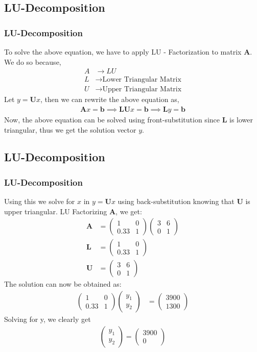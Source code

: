 \documentclass{beamer}
\theoremstyle{remark}
\newcommand{\myvec}[1]{\ensuremath{\begin{pmatrix}#1\end{pmatrix}}}
\let\vec\mathbf
\numberwithin{equation}{section}
\begin{document}
\subsection{LU-Decomposition}
\begin{frame}
	\frametitle{LU-Decomposition}
	To solve the above equation, we have to apply LU - Factorization to matrix $\vec{A}$. \\
	We do so because, 
	\begin{align}
		A &\rightarrow LU \\
		L &\rightarrow \text{Lower Triangular Matrix} \\
		U &\rightarrow \text{Upper Triangular Matrix}
	\end{align}
	Let $y = \vec{U}x$, then we can rewrite the above equation as,
	\begin{align}
		\vec{A}x = \vec{b} \implies \vec{LU}x = \vec{b} \implies \vec{L}y = \vec{b}
	\end{align}
	Now, the above equation can be solved using front-substitution since $\vec{L}$ is lower triangular, thus we get the solution vector $y$. \\
\end{frame}
\subsection{LU-Decomposition}
\begin{frame}
	\frametitle{LU-Decomposition}
	Using this we solve for $x$ in $y = \vec{U}x$ using back-substitution knowing that $\vec{U}$ is upper triangular. LU Factorizing $\vec{A}$, we get:
	\begin{align}
		\vec{A} &= \myvec{1&0\\0.33&1}\myvec{3&6\\0&1} \\ 
		\vec{L} &= \myvec{1&0\\0.33&1} \\
		\vec{U} &= \myvec{3&6\\0&1}
	\end{align}
	The solution can now be obtained as:
	\begin{align}
		\myvec{1&0\\0.33&1}\myvec{y_1 \\ y_2} &= \myvec{3900 \\ 1300}
	\end{align}
	Solving for y, we clearly get
	\begin{align}
		\myvec{y_1 \\ y_2} = \myvec{3900 \\ 0}
	\end{align}
\end{frame}
\end{document}
